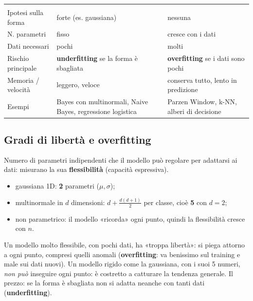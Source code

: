 \begin{center}
\begin{tabularx}{\linewidth}{l Y Y}
 &  & \\
Ipotesi sulla forma & forte (es. gaussiana) & nessuna\\
N. parametri & fisso & cresce con i dati\\
Dati necessari & pochi & molti\\
Rischio principale & \textbf{underfitting} se la forma è sbagliata & \textbf{overfitting} se i dati sono pochi\\
Memoria / velocità & leggero, veloce & conserva tutto, lento in predizione\\
Esempi & Bayes con multinormali, Naive Bayes, regressione logistica & Parzen Window, k-NN, alberi di decisione\\
\end{tabularx}
\end{center}

\subsection{Gradi di libertà e overfitting}
\begin{tecnica}
Numero di parametri indipendenti che il modello può regolare per adattarsi ai dati: misurano la sua \textbf{flessibilità} (capacità espressiva).
\begin{itemize}
  \item gaussiana 1D: \textbf{2} parametri ($\mu,\sigma$);
  \item multinormale in $d$ dimensioni: $d+\frac{d(d+1)}{2}$ per classe, cioè \textbf{5} con $d=2$;
  \item non parametrico: il modello «ricorda» ogni punto, quindi la flessibilità cresce con $n$.
\end{itemize}
\end{tecnica}
\begin{intuizione}[Perché pochi gradi di libertà = meno overfitting]
Un modello molto flessibile, con pochi dati, ha «troppa libertà»: si piega attorno a ogni punto, compresi quelli anomali (\textbf{overfitting}: va benissimo sul training e male sui dati nuovi). Un modello rigido come la gaussiana, con i suoi 5 numeri, \emph{non può} inseguire ogni punto: è costretto a catturare la tendenza generale. Il prezzo: se la forma è sbagliata non si adatta neanche con tanti dati (\textbf{underfitting}).
\end{intuizione}

